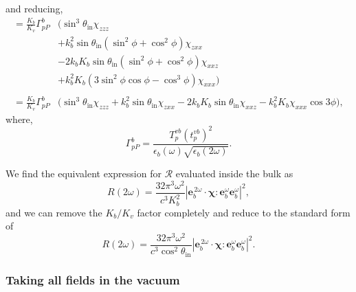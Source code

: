and reducing,
\begin{equation*}
\begin{split}
=
\frac{K_{b}}{K_{v}}
\Gamma^{b}_{pP}
&\big(
   \sin^{3}\theta_{\mathrm{in}}\chi_{zzz}\\
&+ k^{2}_{b}\sin\theta_{\mathrm{in}}(\sin^{2}\phi + \cos^{2}\phi)\chi_{zxx}\\
&- 2k_{b}K_{b}\sin\theta_{\mathrm{in}}(\sin^{2}\phi + \cos^{2}\phi)\chi_{xxz}\\
&+ k^{2}_{b}K_{b}(3\sin^{2}\phi\cos\phi - \cos^{3}\phi)\chi_{xxx}
\big)\\\\
=
\frac{K_{b}}{K_{v}}
\Gamma^{b}_{pP}
&\big(
  \sin^{3}\theta_{\mathrm{in}}\chi_{zzz} 
+ k^{2}_{b}\sin\theta_{\mathrm{in}}\chi_{zxx}
- 2k_{b}K_{b}\sin\theta_{\mathrm{in}}\chi_{xxz}
- k^{2}_{b}K_{b}\chi_{xxx}\cos3\phi
\big),
\end{split}
\end{equation*}
where,
\begin{equation*}
\Gamma^{b}_{pP} =
\frac{T_{p}^{vb}\left(t^{vb}_{p}\right)^{2}}
     {\epsilon_{b}(\omega)\sqrt{\epsilon_{b}(2\omega)}}.
\end{equation*}

We find the equivalent expression for $\mathcal{R}$ evaluated inside the bulk
as
\begin{equation*}
R(2\omega) =
\frac{32\pi^{3} \omega^{2}}{c^{3}K^{2}_{b}}
\left\vert
\mathbf{e}^{\,2\omega}_{b}\cdot\boldsymbol{\chi}:
\mathbf{e}^{\omega}_{b}\mathbf{e}^{\omega}_{b}
\right\vert^{2} 
,
\end{equation*}
and we can remove the $K_{b}/K_{v}$ factor completely and reduce to the
standard form of
\begin{equation*}
R(2\omega) =
\frac{32\pi^{3} \omega^{2}}{c^{3}\cos^{2}\theta_{\mathrm{in}}}
\left\vert
\mathbf{e}^{\,2\omega}_{b}\cdot\boldsymbol{\chi}:
\mathbf{e}^{\omega}_{b}\mathbf{e}^{\omega}_{b}
\right\vert^{2}.
\end{equation*}


\subsubsection{Taking all fields in the vacuum}

